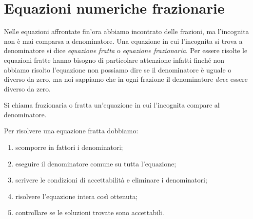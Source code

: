 
% 

\section{Equazioni numeriche frazionarie}
\label{sec:compl1_eqfratte}

Nelle equazioni affrontate fin'ora abbiamo incontrato delle frazioni, ma 
l'incognita non è mai comparsa a denominatore. Una equazione in cui 
l'incognita si trova a denominatore si dice \emph{equazione fratta} o
\emph{equazione frazionaria}. Per essere risolte le equazioni fratte hanno 
bisogno di particolare attenzione infatti finché non abbiamo risolto 
l'equazione non possiamo dire se il denominatore è uguale o diverso da zero, 
ma noi sappiamo che in ogni frazione il denominatore \emph{deve} essere 
diverso da zero. 

\begin{definizione}{}{}
Si chiama frazionaria o fratta un'equazione in cui l'incognita compare 
al denominatore.
\end{definizione}

\begin{procedura}{}{}
Per risolvere una equazione fratta dobbiamo:
\begin{enumerate}[nosep]
\item scomporre in fattori i denominatori;
\item eseguire il denominatore comune su tutta l'equazione;
\item scrivere le condizioni di accettabilità e eliminare i denominatori;
\item risolvere l'equazione intera così ottenuta;
\item controllare se le soluzioni trovate sono accettabili.
\end{enumerate}
\end{procedura}



